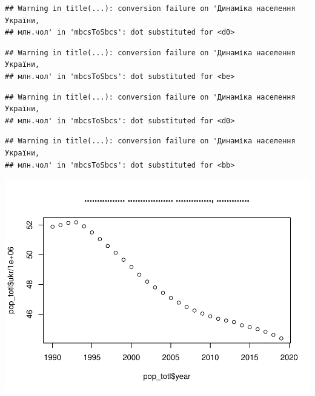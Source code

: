 \documentclass[
]{article}
\begin{document}
\begin{verbatim}
## Warning in title(...): conversion failure on 'Динаміка населення України,
## млн.чол' in 'mbcsToSbcs': dot substituted for <d0>
\end{verbatim}

\begin{verbatim}
## Warning in title(...): conversion failure on 'Динаміка населення України,
## млн.чол' in 'mbcsToSbcs': dot substituted for <be>
\end{verbatim}

\begin{verbatim}
## Warning in title(...): conversion failure on 'Динаміка населення України,
## млн.чол' in 'mbcsToSbcs': dot substituted for <d0>
\end{verbatim}

\begin{verbatim}
## Warning in title(...): conversion failure on 'Динаміка населення України,
## млн.чол' in 'mbcsToSbcs': dot substituted for <bb>
\end{verbatim}

\includegraphics{lab05_files/figure-latex/unnamed-chunk-3-1.pdf}
\end{document}
